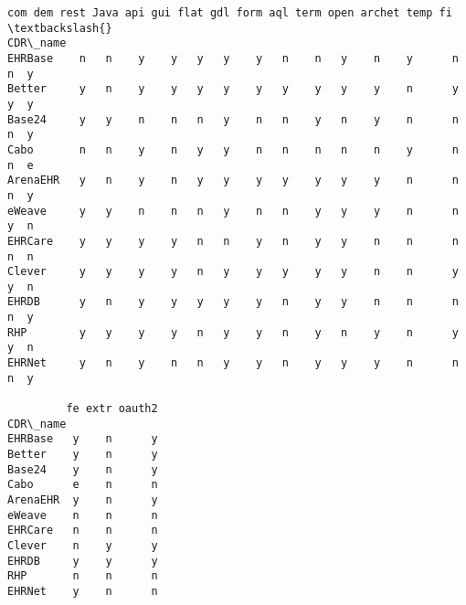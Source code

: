 \documentclass[11pt]{article}
\makeatletter
\newcommand{\boxspacing}{\kern\kvtcb@left@rule\kern\kvtcb@boxsep}
\newcommand{\prompt}[4]{
        \ttfamily\llap{{\color{#2}[#3]:\hspace{3pt}#4}}\vspace{-\baselineskip}
    }
\makeatother
\begin{document}
            \begin{tcolorbox}[breakable, size=fbox, boxrule=.5pt, pad at break*=1mm, opacityfill=0]
\prompt{Out}{outcolor}{565}{\boxspacing}
\begin{Verbatim}[commandchars=\\\{\}]
         com dem rest Java api gui flat gdl form aql term open archet temp fi  \textbackslash{}
CDR\_name
EHRBase    n   n    y    y   y   y    y   n    n   y    n    y      n    n  y
Better     y   n    y    y   y   y    y   y    y   y    y    n      y    y  y
Base24     y   y    n    n   n   y    n   n    y   n    y    n      n    n  y
Cabo       n   n    y    n   y   y    n   n    n   n    n    y      n    n  e
ArenaEHR   y   n    y    n   y   y    y   y    y   y    y    n      n    n  y
eWeave     y   y    n    n   n   y    n   n    y   y    y    n      n    y  n
EHRCare    y   y    y    y   n   n    y   n    y   y    n    n      n    n  n
Clever     y   y    y    y   n   y    y   y    y   y    n    n      y    y  n
EHRDB      y   n    y    y   y   y    y   n    y   y    n    n      n    n  y
RHP        y   y    y    y   n   y    y   n    y   n    y    n      y    y  n
EHRNet     y   n    y    n   n   y    y   n    y   y    y    n      n    n  y

         fe extr oauth2
CDR\_name
EHRBase   y    n      y
Better    y    n      y
Base24    y    n      y
Cabo      e    n      n
ArenaEHR  y    n      y
eWeave    n    n      n
EHRCare   n    n      n
Clever    n    y      y
EHRDB     y    y      y
RHP       n    n      n
EHRNet    y    n      n
\end{Verbatim}
\end{tcolorbox}
        
\end{document}
